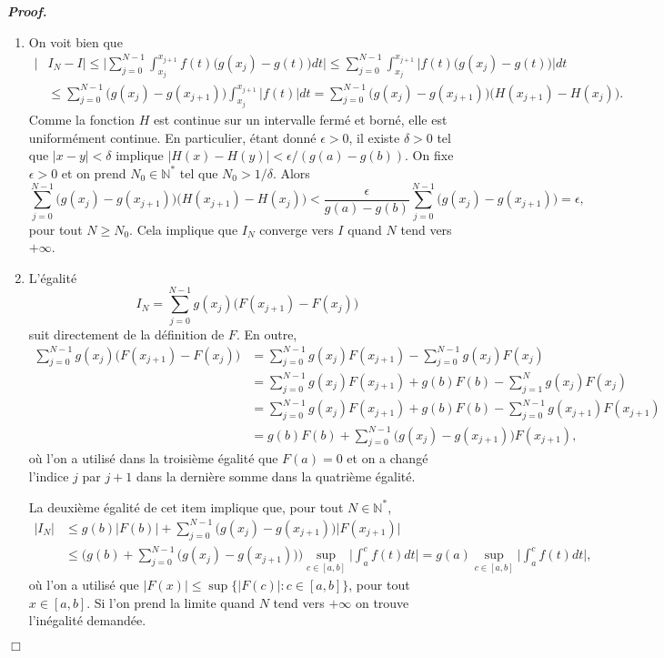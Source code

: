 \documentclass[11pt,a4paper]{article}
\newcommand{\NN}{\mathbb{N}}
\newenvironment{preuve}[1][]
{\vskip 2mm  \noindent\emph{\bf Proof#1. }}{$\Box$ \vskip 2mm}
\let\geq\geqslant
\let\leq\leqslant
\begin{document}
	\begin{preuve}
		\begin{enumerate}
			\item On voit bien que 
			\begin{align*}
			| &I_N - I | \leq \bigg| \sum_{j=0}^{N-1}\int_{x_j}^{x_{j+1}}f(t)\big(g(x_j)-g(t)\big)dt \bigg| 
			\leq \sum_{j=0}^{N-1}\int_{x_j}^{x_{j+1}} \Big| f(t)\big(g(x_j)-g(t)\big) \Big| dt 
			\\
			&\leq \sum_{j=0}^{N-1} \big(g(x_j)-g(x_{j+1})\big) \int_{x_j}^{x_{j+1}} |f(t)| dt 
			= \sum_{j=0}^{N-1}\big(g(x_j)-g(x_{j+1})\big)\big(H(x_{j+1})-H(x_j)\big).     
			\end{align*}
			Comme la fonction $H$ est continue sur un intervalle fermé et borné, elle est uniformément continue.
			En particulier, étant donné $\epsilon > 0$, il existe $\delta > 0$ tel que $|x-y| < \delta$ implique $|H(x) - H(y)| < \epsilon/(g(a)-g(b))$. 
			On fixe $\epsilon > 0$ et on prend $N_{0} \in \NN^{*}$ tel que $N_{0} > 1/\delta$. 
			Alors 
			\[     \sum_{j=0}^{N-1}\big(g(x_j)-g(x_{j+1})\big)\big(H(x_{j+1})-H(x_j)\big) < \frac{\epsilon}{g(a)-g(b)} \sum_{j=0}^{N-1}\big(g(x_j)-g(x_{j+1})\big) = \epsilon,     \]
			pour tout $N \geq N_{0}$. 
			Cela implique que $I_{N}$ converge vers $I$ quand $N$ tend vers $+ \infty$. 
			
			\item L'égalité 
			\[     I_N=\sum_{j=0}^{N-1}g(x_j)\big(F(x_{j+1})-F(x_j)\big)     \]
			suit directement de la définition de $F$. 
			En outre, 
			\begin{align*}
			\sum_{j=0}^{N-1}g(x_j)\big(F(x_{j+1})-F(x_j)\big) &= \sum_{j=0}^{N-1}g(x_j) F(x_{j+1}) - \sum_{j=0}^{N-1}g(x_j) F(x_j) 
			\\
			&= \sum_{j=0}^{N-1}g(x_j) F(x_{j+1}) +g(b) F(b) - \sum_{j=1}^{N}g(x_j) F(x_j) 
			\\
			&= \sum_{j=0}^{N-1}g(x_j) F(x_{j+1}) +g(b) F(b) - \sum_{j=0}^{N-1}g(x_{j+1}) F(x_{j+1}) 
			\\
			&= g(b)F(b)+\sum_{j=0}^{N-1}\big(g(x_j)-g(x_{j+1})\big)F(x_{j+1}),
			\end{align*}
			où l'on a utilisé dans la troisième égalité que $F(a) = 0$ et on a changé l'indice $j$ par $j+1$ dans la dernière somme dans la quatrième égalité. 
			
			La deuxième égalité de cet item implique que, pour tout $N \in \NN^{*}$, 
			\begin{align*}     
			|I_{N}| &\leq g(b)\big|F(b)\big|+\sum_{j=0}^{N-1}\big(g(x_j)-g(x_{j+1})\big)\big|F(x_{j+1})\big| 
			\\
			&\leq 
			\Big(g(b)+\sum_{j=0}^{N-1}\big(g(x_j)-g(x_{j+1})\big)\Big) \sup_{c\in[a,b]}\bigg|\int_a^cf(t)dt\bigg| 
			= g(a)\sup_{c\in[a,b]}\bigg|\int_a^cf(t)dt\bigg|,     
			\end{align*}
			où l'on a utilisé que $|F(x)| \leq \sup\{ |F(c)| : c \in [a,b] \}$, pour tout $x \in [a,b]$. 
			Si l'on prend la limite quand $N$ tend vers $+ \infty$ on trouve l'inégalité demandée. 
			

\end{enumerate}
\end{preuve}
\end{document}
